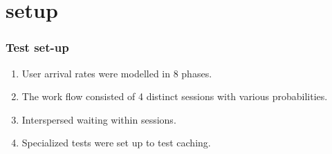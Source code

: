 \section{setup}
\begin{frame}
\frametitle{Test set-up}

\begin{enumerate}
	\item User arrival rates were modelled in 8 phases.
	\item The work flow consisted of 4 distinct sessions with various probabilities.
	\item Interspersed waiting within sessions.
	\item Specialized tests were set up to test caching.  
\end{enumerate}
\end{frame}
